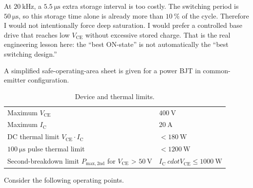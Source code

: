 
\begin{solutionblock}
    At $\SI{20}{\kilo\hertz}$, a $\SI{5.5}{\micro\second}$ extra storage interval is too costly. The switching period is $\SI{50}{\micro\second}$, 
    so this storage time alone is already more than $\SI{10}{\percent}$ of the cycle. 
    Therefore I would not intentionally force deep saturation. I would prefer a controlled base drive that reaches low $V_\mathrm{CE}$ 
    without excessive stored charge.
    That is the real engineering lesson here: the ``best ON-state'' is not automatically the ``best switching design.''
\end{solutionblock} 



A simplified safe-operating-area sheet is given for a power BJT in common-emitter configuration.

\begin{table}[ht]
    \centering  %
    \begin{tabular}{ll}
        \toprule
        Maximum $V_\mathrm{CE}$    &  $\SI{400}{\volt}$ \\ 
        Maximum $I_\mathrm{C}$   &  $\SI{20}{\ampere}$ \\ 
        DC thermal limit $V_\mathrm{CE} \cdot I_\mathrm{C}$ &  $< \SI{180}{\watt}$ \\ 
        $\SI{100}{\micro\second}$ pulse thermal limit &  $< \SI{1200}{\watt}$\\
        Second-breakdown limit $P_\mathrm{max,2nd}$ for $V_\mathrm{CE}$ > $\SI{50}{\volt}$ & $I_\mathrm{C} \ cdot V_\mathrm{CE} \leq \SI{1000}{\watt}$ \\
        \bottomrule
    \end{tabular}
    \caption{Device and thermal limits.}
    \label{table:ex02_DevAndThermalLimits}
\end{table}

Consider the following operating points.

